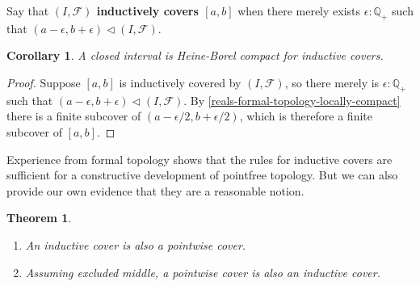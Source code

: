 \documentclass[12pt]{article}
\newcommand{\cover}{\triangleleft}
\newcommand{\define}[1]{\textbf{#1}}
\newcommand{\pairr}[1]{{\mathopen{}(#1)\mathclose{}}}
\newcommand{\Q}{\ensuremath{\mathbb{Q}}\xspace}
\newcommand{\Qp}{\Q_{+}}
\newcounter{mathcount}
\newtheorem{precor}{Corollary}
\newenvironment{cor}{\begin{precor}}{\end{precor}\addtocounter{mathcount}{1}}
\newtheorem{prethm}{Theorem}
\newenvironment{thm}{\begin{prethm}}{\end{prethm}\addtocounter{mathcount}{1}}
\let\autoref\cref
\begin{document}
Say that \define{$\pairr{I, \mathcal{F}}$ inductively covers
  $[a, b]$} when there merely exists $\epsilon : \Qp$ such that $(a - \epsilon, b +
\epsilon) \cover \pairr{I, \mathcal{F}}$.

\begin{cor} \label{interval-Heine-Borel}
  A closed interval is Heine-Borel compact for inductive covers.
\end{cor}

\begin{proof}
  Suppose $[a, b]$ is inductively covered by $\pairr{I, \mathcal{F}}$, so there merely is
  $\epsilon : \Qp$ such that $(a - \epsilon, b + \epsilon) \cover \pairr{I, \mathcal{F}}$.
  By \autoref{reals-formal-topology-locally-compact} there is a finite subcover of
  $(a - \epsilon/2, b + \epsilon/2)$, which is therefore a finite subcover of $[a, b]$.
\end{proof}

Experience from formal topology shows that the rules for inductive covers are sufficient
for a constructive development of pointfree topology. But we can also provide our own
evidence that they are a reasonable notion.

\begin{thm} \label{inductive-cover-classical}
  \mbox{}
  \begin{enumerate}
  \item An inductive cover is also a pointwise cover.
  \item Assuming excluded middle, a pointwise cover is also an inductive cover.
  \end{enumerate}
\end{thm}
\end{document}
